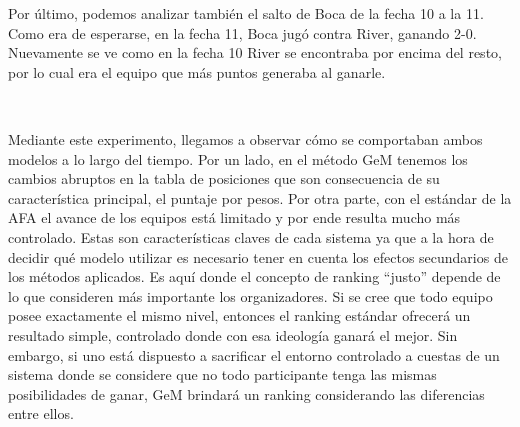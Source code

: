 Por último, podemos analizar también el salto de Boca de la fecha 10 a la 11.
Como era de esperarse, en la fecha 11, Boca jugó contra River, ganando 2-0.
Nuevamente se ve como en la fecha 10 River se encontraba por encima del resto,
por lo cual era el equipo que más puntos generaba al ganarle.

~

Mediante este experimento, llegamos a observar cómo se comportaban ambos modelos
a lo largo del tiempo. Por un lado, en el método GeM tenemos los cambios
abruptos en la tabla de posiciones que son consecuencia de su característica
principal, el puntaje por pesos. Por otra parte, con el estándar de la AFA el
avance de los equipos está limitado y por ende resulta mucho más controlado.
Estas son características claves de cada sistema ya que a la hora de decidir qué
modelo utilizar es necesario tener en cuenta los efectos secundarios de los
métodos aplicados.
Es aquí donde el concepto de ranking ``justo'' depende de lo que consideren más
importante los organizadores. Si se cree que todo equipo posee exactamente el
mismo nivel, entonces el ranking estándar ofrecerá un resultado simple,
controlado donde con esa ideología ganará el mejor. Sin embargo, si uno está
dispuesto a sacrificar el entorno controlado a cuestas de un sistema donde se
considere que no todo participante tenga las mismas posibilidades de ganar, GeM brindará un
ranking considerando las diferencias entre ellos.
